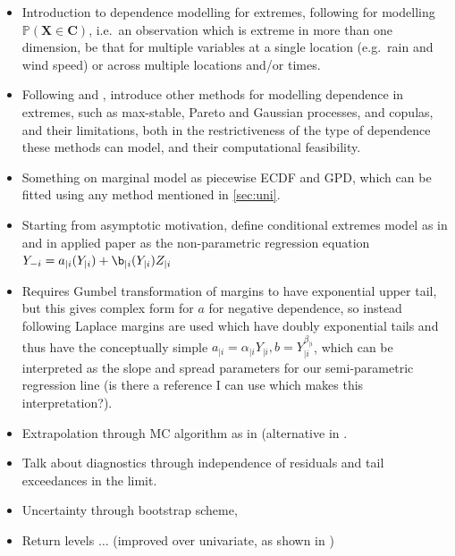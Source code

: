 \documentclass{article}
\numberwithin{equation}{section}
\begin{document}
\begin{itemize}
  \item Introduction to dependence modelling for extremes, following \cite{Heffernan2004} for modelling $\mathbb{P}(\bm{X} \in \bm{C})$, i.e.\ an observation which is extreme in more than one dimension, be that for multiple variables at a single location (e.g.\ rain and wind speed) or across multiple locations and/or times. 
  \item Following \cite{Tawn2018} and \cite{Heffernan2004}, introduce other methods for modelling dependence in extremes, such as max-stable, Pareto and Gaussian processes, and copulas, and their limitations, both in the restrictiveness of the type of dependence these methods can model, and their computational feasibility.
  \item Something on marginal model as piecewise ECDF and GPD, which can be fitted using any method mentioned in \ref{sec:uni}. 
  \item Starting from asymptotic motivation, define conditional extremes model as in \cite{Heffernan2004} and in applied paper as the non-parametric regression equation $Y_{-i} = a_{\mid i}(Y_{\mid i}) + \b_{\mid i}(Y_{\mid i}) Z_{\mid i}$
  \item Requires Gumbel transformation of margins to have exponential upper tail, but this gives complex form for $a$ for negative dependence, so instead following \cite{Keef2013} Laplace margins are used which have doubly exponential tails and thus have the conceptually simple $a_{\mid i} = \alpha_{\mid i}Y_{\mid i} , b = Y_{\mid i}^{\beta_{\mid i}}$, which can be interpreted as the slope and spread parameters for our semi-parametric regression line (is there a reference I can use which makes this interpretation?). 
  \item Extrapolation through MC algorithm as in \cite{Heffernan2004} (alternative in \cite{Keef2013}.
  \item Talk about diagnostics through independence of residuals and tail exceedances in the limit. 
  \item Uncertainty through bootstrap scheme,
  \item Return levels $\ldots$ (improved over univariate, as shown in \cite{Winter2016})
\end{itemize}
\end{document}

